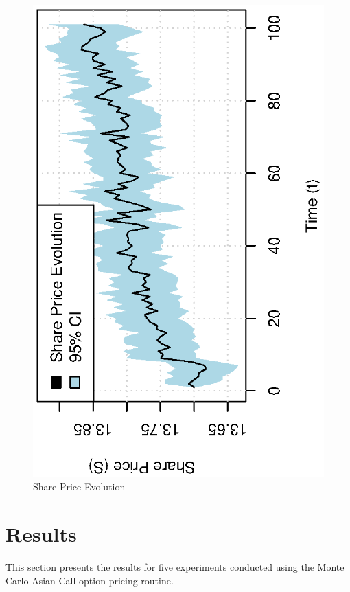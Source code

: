 \documentclass[12pt,a4paper]{article}
\begin{document}
\begin{figure}[!ht]
  \centering
  \includegraphics[scale=0.85,angle=-90]{./images/sobol/share_evo.eps}
  \caption{Share Price Evolution}
  \label{fig:share-evo-sobol}
\end{figure}


\section{Results}
\label{sec:results}

This section presents the results for five experiments conducted using
the Monte Carlo Asian Call option pricing routine.
\end{document}

